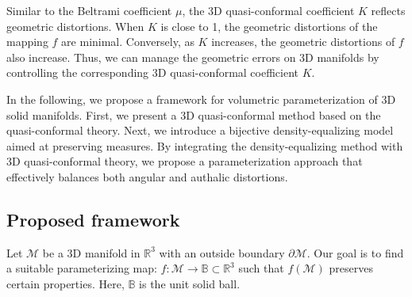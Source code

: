 \documentclass{article}
\begin{document}


Similar to the Beltrami coefficient $\mu$, the 3D quasi-conformal coefficient  $K$ reflects geometric distortions. When $K$ is close to 1, the geometric distortions of the mapping $f$ are minimal. Conversely, as $K$ increases, the geometric distortions of $f$ also increase. 
Thus, we can manage the geometric errors on 3D manifolds by controlling the corresponding 3D quasi-conformal coefficient $K$.

In the following, we propose a framework for volumetric parameterization of 3D solid manifolds. First, we present a 3D quasi-conformal method based on the quasi-conformal theory. Next, we introduce a bijective density-equalizing model aimed at preserving measures. By integrating the density-equalizing method with 3D quasi-conformal theory, we propose a parameterization approach that effectively balances both angular and authalic distortions.

\subsection{Proposed framework}
Let $\mathcal{M}$ be a 3D manifold in $\mathbb R^3$ with an outside boundary $\partial \mathcal{M}$. Our goal is to find a suitable parameterizing map: $f: \mathcal{M} \rightarrow \mathbb B \subset \mathbb R^3$ such that $f\left( \mathcal{M} \right)$ preserves certain properties. Here, $\mathbb B$ is the unit solid ball. %
\end{document}
